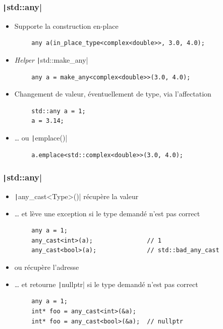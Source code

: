 \documentclass[C++.tex]{subfiles}
\begin{document}
\begin{frame}[fragile]
	\frametitle{\texttt|std::any|}
	\begin{itemize}
		\item Supporte la construction en-place
	\end{itemize}

	\begin{verbatim}
		any a(in_place_type<complex<double>>, 3.0, 4.0);
	\end{verbatim}

	\begin{itemize}
		\item \textit{Helper} \texttt|std::make_any|
	\end{itemize}

	\begin{verbatim}
		any a = make_any<complex<double>>(3.0, 4.0);
	\end{verbatim}

	\begin{itemize}
		\item Changement de valeur, éventuellement de type, via l'affectation
	\end{itemize}

	\begin{verbatim}
		std::any a = 1;
		a = 3.14;
	\end{verbatim}

	\begin{itemize}
		\item \ldots{} ou \texttt|emplace()|
	\end{itemize}

	\begin{verbatim}
		a.emplace<std::complex<double>>(3.0, 4.0);
	\end{verbatim}
\end{frame}

\begin{frame}[fragile]
	\frametitle{\texttt|std::any|}
	\begin{itemize}
		\item \texttt|any_cast<Type>()| récupère la valeur
		\item \ldots{} et lève une exception si le type demandé n'est pas correct
	\end{itemize}

	\begin{verbatim}
		any a = 1;
		any_cast<int>(a);               // 1
		any_cast<bool>(a);              // std::bad_any_cast
	\end{verbatim}

	\begin{itemize}
		\item ou récupère l'adresse
		\item \ldots{} et retourne \texttt|nullptr| si le type demandé n'est pas correct
	\end{itemize}

	\begin{verbatim}
		any a = 1;
		int* foo = any_cast<int>(&a);
		int* foo = any_cast<bool>(&a);  // nullptr
	\end{verbatim}
\end{frame}
\end{document}
